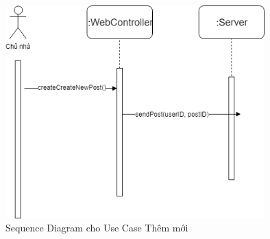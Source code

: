 \begin{figure}[!h]
	\centering
	\includegraphics[width=10cm]{parts/bao/images/SequenceDiagram_NewPost.png}
	\caption{Sequence Diagram cho Use Case Thêm mới}
\end{figure}
